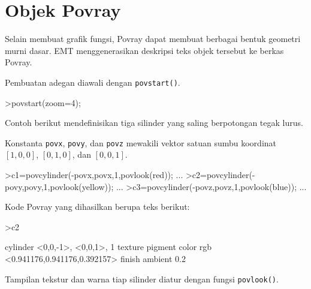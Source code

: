 \documentclass[a4paper,11pt,oneside,enabledeprecatedfontcommands]{scrbook}
\newenvironment{eulernotebook}{}{}
\newcommand{\eulerheading}[1]{\chapter{#1}}
\newenvironment{eulercomment}{\par\medskip\noindent}{\par\medskip}
\begin{document}
\begin{eulernotebook}
\eulerheading{Objek Povray}
\begin{eulercomment}
Selain membuat grafik fungsi, Povray dapat membuat berbagai bentuk geometri murni dasar.
EMT menggenerasikan deskripsi teks objek tersebut ke berkas Povray.

Pembuatan adegan diawali dengan \texttt{povstart()}.
\end{eulercomment}
\begin{eulerprompt}
>povstart(zoom=4);
\end{eulerprompt}
\begin{eulercomment}
Contoh berikut mendefinisikan tiga silinder yang saling berpotongan tegak lurus.

Konstanta \texttt{povx}, \texttt{povy}, dan \texttt{povz} mewakili vektor satuan sumbu koordinat $[1,0,0]$, $[0,1,0]$,
dan $[0,0,1]$.
\end{eulercomment}
\begin{eulerprompt}
>c1=povcylinder(-povx,povx,1,povlook(red)); ...
>c2=povcylinder(-povy,povy,1,povlook(yellow)); ...
>c3=povcylinder(-povz,povz,1,povlook(blue)); ...
\end{eulerprompt}
\begin{eulercomment}
Kode Povray yang dihasilkan berupa teks berikut:
\end{eulercomment}
\begin{eulerprompt}
>c2
\end{eulerprompt}
\begin{euleroutput}
cylinder { <0,0,-1>, <0,0,1>, 1
    texture { pigment { color rgb <0.941176,0.941176,0.392157> }  } 
    finish { ambient 0.2 } 
}
\end{euleroutput}
\begin{eulercomment}
Tampilan tekstur dan warna tiap silinder diatur dengan fungsi \texttt{povlook()}.


\end{eulercomment}
\end{eulernotebook}
\end{document}

